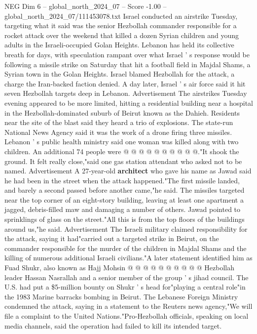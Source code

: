 \begin{textsample}{NEG Dim 6 – global\_north\_2024\_07 – Score -1.00 – global\_north\_2024\_07/111453078.txt}  \label{ex:f6_neg_142}
Israel conducted an airstrike Tuesday, targeting what it said was the senior Hezbollah commander responsible for a rocket attack over the weekend that killed a dozen Syrian children and young adults in the Israeli-occupied Golan Heights.
Lebanon has held its collective breath for days, with speculation rampant over what Israel ' s response would be following a missile strike on Saturday that hit a football field in Majdal Shams, a Syrian town in the Golan Heights.
Israel blamed Hezbollah for the attack, a charge the Iran-backed faction denied.
A day later, Israel ' s air force said it hit seven Hezbollah targets deep in Lebanon.
Advertisement The airstrikes Tuesday evening appeared to be more limited, hitting a residential building near a hospital in the Hezbollah-dominated suburb of Beirut known as the Dahieh.
Residents near the site of the blast said they heard a trio of explosions.
The state-run National News Agency said it was the work of a drone firing three missiles.
Lebanon ' s public health ministry said one woman was killed along with two children.
An additional 74 people were @ @ @ @ @ @ @ @ @ @."It shook the ground.
It felt really close,"said one gas station attendant who asked not to be named.
Advertisement A 27-year-old \textbf{architect} who gave his name as Jawad said he had been in the street when the attack happened."The first missile landed, and barely a second passed before another came,"he said.
The missiles targeted near the top corner of an eight-story building, leaving at least one apartment a jagged, debris-filled maw and damaging a number of others.
Jawad pointed to sprinklings of glass on the street."All this is from the top floors of the buildings around us,"he said.
Advertisement The Israeli military claimed responsibility for the attack, saying it had"carried out a targeted strike in Beirut, on the commander responsible for the murder of the children in Majdal Shams and the killing of numerous additional Israeli civilians."A later statement identified him as Fuad Shukr, also known as Hajj Mohsin @ @ @ @ @ @ @ @ @ @ Hezbollah leader Hassan Nasrallah and a senior member of the group ' s jihad council.
The U.S. had put a \$5-million bounty on Shukr ' s head for"playing a central role"in the 1983 Marine barracks bombing in Beirut.
The Lebanese Foreign Ministry condemned the attack, saying in a statement to the Reuters news agency,"We will file a complaint to the United Nations."Pro-Hezbollah officials, speaking on local media channels, said the operation had failed to kill its intended target.

\end{textsample}
